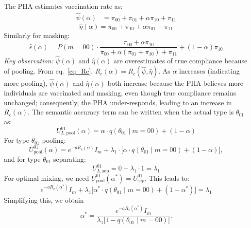 \documentclass[sigconf,review]{acmart}
\begin{document}
The PHA estimates vaccination rate as:
\begin{equation}
\begin{aligned}
\hat{\psi}(\alpha) &= \pi_{00} + \pi_{01} + \alpha\pi_{10}+ \pi_{11}
\end{aligned}
\end{equation}
\begin{equation}
\hat{\eta}(\alpha) = \pi_{00} + \pi_{10} + \alpha\pi_{01}+ \pi_{11}
\end{equation}
Similarly for masking:
\begin{equation}
\hat{\epsilon}(\alpha) = P(m = 00) \cdot \frac{\pi_{00} + \alpha \pi_{10}}{\pi_{00} + \alpha(\pi_{01} + \pi_{10}) + \pi_{11}} + (1 - \alpha)\pi_{10}
\end{equation}
\textit{Key observation:} $\hat{\psi}(\alpha)$ and $\hat{\eta}(\alpha)$ are overestimates of true compliance because of pooling. From eq.~\eqref{eq_Rc}, $R_c(\alpha) = R_c(\hat{\psi},\hat{\eta})$. As $\alpha$ increases (indicating more pooling), $\hat{\psi}(\alpha)$ and $\hat{\eta}(\alpha)$ both increase because the PHA believes more individuals are vaccinated and masking, even though true compliance remains unchanged; consequently, the PHA under-responds, leading to an increase in $R_c(\alpha)$. The semantic accuracy term can be written when the actual type is $\theta_{01}$ as:
\begin{equation}
U_{L,\text{pool}}^{01}(\alpha) = \alpha \cdot q(\theta_{01} \mid m = 00) + (1 - \alpha)
\end{equation}
For type $\theta_{01}$ pooling:
\begin{equation}
U^{01}_{\text{pool}}(\alpha) = e^{-a R_c(\alpha)} I_m + \lambda_1 \cdot \big[ \alpha \cdot q(\theta_{01} \mid m = 00) + (1 - \alpha) \big],
\end{equation}
and for type $\theta_{01}$ separating:
\begin{equation}
U^{01}_{L,\text{sep}} = 0 + \lambda_1 \cdot 1 = \lambda_1
\end{equation}
For optimal mixing,
we need
$U^{01}_{\text{pool}}(\alpha^*) = U^{01}_{\text{sep}}. $ This leads to:
\begin{equation}
e^{-a R_c(\alpha^*)} I_m + \lambda_1 \big[ \alpha^* \cdot q(\theta_{01} \mid m = 00) + (1 - \alpha^*) \big] = \lambda_1
\end{equation}
Simplifying this, we obtain
\begin{equation}
\alpha^* = \frac{e^{-a R_c(\alpha^*)} I_m}{\lambda_1 \big[ 1 - q(\theta_{01} \mid m = 00) \big]}.
\end{equation}
\end{document}
